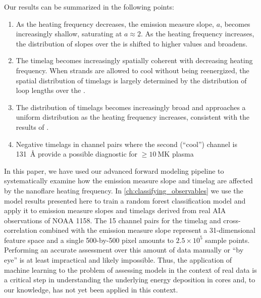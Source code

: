 Our results can be summarized in the following points:
\begin{enumerate}
    \item As the heating frequency decreases, the emission measure slope, $a$, becomes increasingly shallow, saturating at $a\approx2$. As the heating frequency increases, the distribution of slopes over the \AR{} is shifted to higher values and broadens.
    \item The timelag becomes increasingly spatially coherent with decreasing heating frequency. When strands are allowed to cool without being reenergized, the spatial distribution of timelags is largely determined by the distribution of loop lengths over the \AR{}.
    \item The distribution of timelags becomes increasingly broad and approaches a uniform distribution as the heating frequency increases, consistent with the results of \citet{viall_signatures_2016}.
    \item Negative timelags in channel pairs where the second (``cool'') channel is \SI{131}{\angstrom} provide a possible diagnostic for $\ge\SI{10}{\mega\kelvin}$ plasma
\end{enumerate}

In this paper, we have used our advanced forward modeling pipeline to systematically examine how the emission measure slope and timelag are affected by the nanoflare heating frequency. In \autoref{ch:classifying_observables} we use the model results presented here to train a random forest classification model and apply it to emission measure slopes and timelags derived from real AIA observations of NOAA 1158. The 15 channel pairs for the timelag and cross-correlation combined with the emission measure slope represent a 31-dimensional feature space and a single 500-by-500 pixel \AR{} amounts to $2.5\times10^5$ sample points. Performing an accurate assessment over this amount of data manually or ``by eye'' is at least impractical and likely impossible. Thus, the application of machine learning to the problem of assessing models in the context of real data is a critical step in understanding the underlying energy deposition in \AR{} cores and, to our knowledge, has not yet been applied in this context. 
